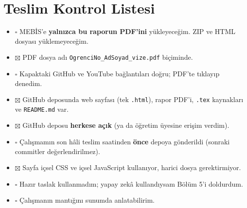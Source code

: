 \documentclass[12pt,a4paper]{article}
\begin{document}
\appendix
\section{Teslim Kontrol Listesi}
\begin{itemize}[label={}]
  \item $\square$ MEBİS'e \textbf{yalnızca bu raporun PDF'ini} yükleyeceğim. ZIP ve HTML dosyası yüklemeyeceğim.
  \item $\boxtimes$ PDF dosya adı \texttt{OgrenciNo\_AdSoyad\_vize.pdf} biçiminde.
  \item $\square$ Kapaktaki GitHub ve YouTube bağlantıları doğru; PDF'te tıklayıp denedim.
  \item $\boxtimes$ GitHub deposunda web sayfası (tek \texttt{.html}), rapor PDF'i, \texttt{.tex} kaynakları ve \texttt{README.md} var.
  \item $\boxtimes$ GitHub deposu \textbf{herkese açık} (ya da öğretim üyesine erişim verdim).
  \item $\square$ Çalışmamın son hâli teslim saatinden \textbf{önce} depoya gönderildi (sonraki commitler değerlendirilmez).
  \item $\boxtimes$ Sayfa içsel CSS ve içsel JavaScript kullanıyor, harici dosya gerektirmiyor.
  \item $\square$ Hazır taslak kullanmadım; yapay zekâ kullandıysam Bölüm 5'i doldurdum.
  \item $\square$ Çalışmanın mantığını sunumda anlatabilirim.
\end{itemize}
\end{document}
